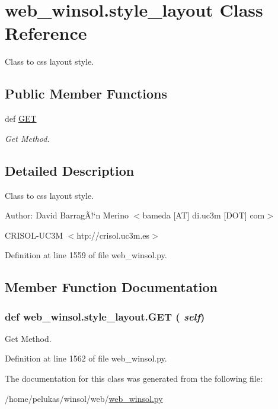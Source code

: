 \hypertarget{classweb__winsol_1_1style__layout}{
\section{web\_\-winsol.style\_\-layout Class Reference}
\label{classweb__winsol_1_1style__layout}
}
Class to css layout style.  


\subsection*{Public Member Functions}
\begin{CompactItemize}
\item 
def \hyperlink{classweb__winsol_1_1style__layout_e73be1204dfc276174efa934063f719a}{GET}
\begin{CompactList}\small\item\em Get Method. \item\end{CompactList}\end{CompactItemize}


\subsection{Detailed Description}
Class to css layout style. 

\begin{Desc}
\item[Author:]David Barrag\~{A}!`n Merino $<$bameda \mbox{[}AT\mbox{]} di.uc3m \mbox{[}DOT\mbox{]} com$>$ 

CRISOL-UC3M $<$htp://crisol.uc3m.es$>$ \end{Desc}




Definition at line 1559 of file web\_\-winsol.py.

\subsection{Member Function Documentation}
\hypertarget{classweb__winsol_1_1style__layout_e73be1204dfc276174efa934063f719a}{
\subsubsection[GET]{\setlength{\rightskip}{0pt plus 5cm}def web\_\-winsol.style\_\-layout.GET ( {\em self})}}
\label{classweb__winsol_1_1style__layout_e73be1204dfc276174efa934063f719a}


Get Method. 



Definition at line 1562 of file web\_\-winsol.py.

The documentation for this class was generated from the following file:\begin{CompactItemize}
\item 
/home/pelukas/winsol/web/\hyperlink{web__winsol_8py}{web\_\-winsol.py}\end{CompactItemize}
